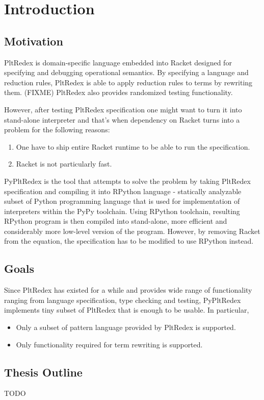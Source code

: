 \chapter{Introduction}
\section{Motivation}
PltRedex is domain-specific language embedded into Racket designed for specifying and debugging operational semantics. By specifying a language and reduction rules, PltRedex is able to apply reduction rules to terms by rewriting them. (FIXME) PltRedex also provides randomized testing functionality.

However, after testing PltRedex specification one might want to turn it into stand-alone interpreter and that's when dependency on Racket turns into a problem for the following reasons:

\begin{enumerate}
\item 
One have to ship entire Racket runtime to be able to run the specification.
\item
Racket is not particularly fast. 
\end{enumerate}

PyPltRedex is the tool that attempts to solve the problem by taking PltRedex specification and compiling it into RPython language - statically analyzable subset of Python programming language that is used for implementation of interpreters within the PyPy toolchain. Using RPython toolchain, resulting RPython program is then compiled into stand-alone, more efficient and considerably more low-level version of the program. However, by removing Racket from the equation, the specification has to be modified to use RPython instead.

\section{Goals}
Since PltRedex has existed for a while and provides wide range of functionality ranging from language specification, type checking and testing, PyPltRedex implements tiny subset of PltRedex that is enough to be usable. In particular,

\begin{itemize}
\item Only a subset of pattern language provided by PltRedex is supported.
\item
Only functionality required for term rewriting is supported.
\end{itemize}

\section{Thesis Outline}
TODO

